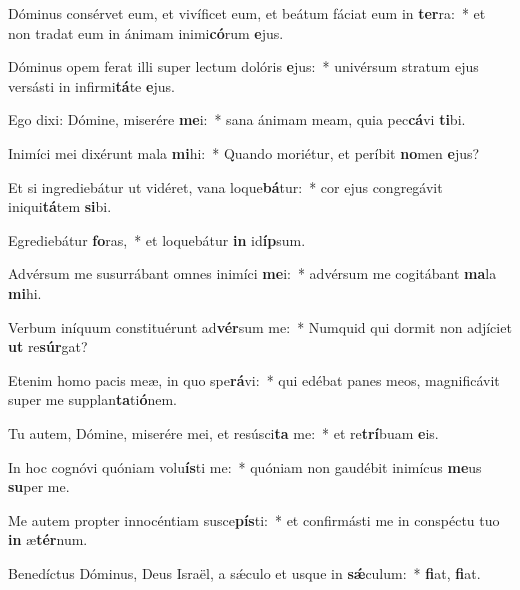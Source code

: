 \item Dóminus consérvet eum, et vivíficet eum, et beátum fáciat eum in \textbf{ter}ra:~* et non tradat eum in ánimam inimi\textbf{có}rum \textbf{e}jus.
\item Dóminus opem ferat illi super lectum dolóris \textbf{e}jus:~* univérsum stratum ejus versásti in infirmi\textbf{tá}te \textbf{e}jus.
\item Ego dixi: Dómine, miserére \textbf{me}i:~* sana ánimam meam, quia pec\textbf{cá}vi \textbf{ti}bi.
\item Inimíci mei dixérunt mala \textbf{mi}hi:~* Quando moriétur, et períbit \textbf{no}men \textbf{e}jus?
\item Et si ingrediebátur ut vidéret, vana loque\textbf{bá}tur:~* cor ejus congregávit iniqui\textbf{tá}tem \textbf{si}bi.
\item Egrediebátur \textbf{fo}ras,~* et loquebátur \textbf{in} id\textbf{íp}sum.
\item Advérsum me susurrábant omnes inimíci \textbf{me}i:~* advérsum me cogitábant \textbf{ma}la \textbf{mi}hi.
\item Verbum iníquum constituérunt ad\textbf{vér}sum me:~* Numquid qui dormit non adjíciet \textbf{ut} re\textbf{súr}gat?
\item Etenim homo pacis meæ, in quo spe\textbf{rá}vi:~* qui edébat panes meos, magnificávit super me supplan\textbf{ta}ti\textbf{ó}nem.
\item Tu autem, Dómine, miserére mei, et resúsci\textbf{ta} me:~* et re\textbf{trí}buam \textbf{e}is.
\item In hoc cognóvi quóniam volu\textbf{ís}ti me:~* quóniam non gaudébit inimícus \textbf{me}us \textbf{su}per me.
\item Me autem propter innocéntiam susce\textbf{pís}ti:~* et confirmásti me in conspéctu tuo \textbf{in} æ\textbf{tér}num.
\item Benedíctus Dóminus, Deus Israël, a sǽculo et usque in \textbf{sǽ}culum:~* \textbf{fi}at, \textbf{fi}at.
